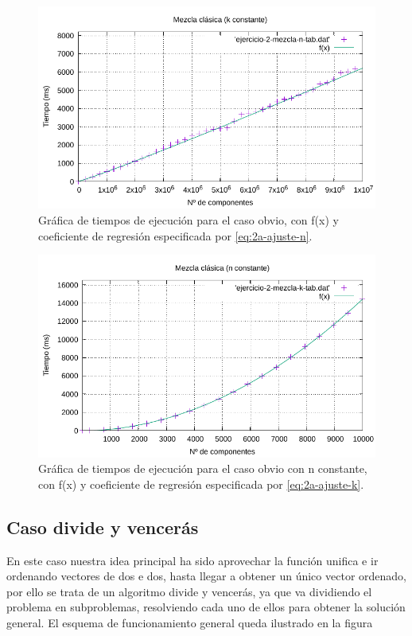\begin{figure}[h]
    \centering
    \includegraphics[scale=0.76]{img/e2a-graph.pdf}
    \caption{Gráfica de tiempos de ejecución para el caso obvio, 
    con f(x) y coeficiente de regresión especificada por \ref{eq:2a-ajuste-n}.}
    \label{fig:2a-obvio-n-graph}
\end{figure}

\begin{figure}[h]
	\centering
	\includegraphics[scale=0.76]{img/e2-obvio-k.pdf}
	\caption{Gráfica de tiempos de ejecución para el caso obvio con n constante, 
		con f(x) y coeficiente de regresión especificada por \ref{eq:2a-ajuste-k}.}
	\label{fig:2a-obvio-k-graph}
\end{figure}


\subsection{Caso divide y vencerás}

En este caso nuestra idea principal ha sido aprovechar la función unifica e ir ordenando vectores de dos e dos,
hasta llegar a obtener un único vector ordenado, por ello se trata de un algoritmo divide y vencerás, ya que va dividiendo 
el problema en subproblemas, resolviendo cada uno de ellos para obtener la solución general. El esquema de 
funcionamiento general queda ilustrado en la figura 


